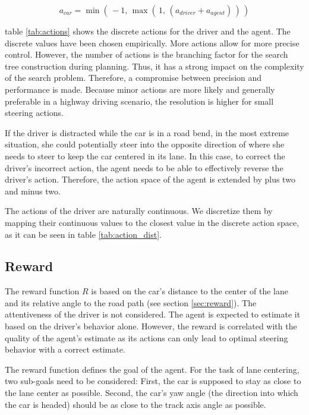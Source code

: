 \begin{equation}
    a_{car} = \min(\, -1, \, \max(\, 1, \, (a_{driver} + a_{agent})\,)\,)
    \label{eq:steering}
\end{equation}

\vspace{1em}
\noindent
table \ref{tab:actions} shows the discrete actions for the driver and the agent. The discrete values have been chosen empirically. More actions allow for more precise control. However, the number of actions is the branching factor for the search tree construction during planning. Thus, it has a strong impact on the complexity of the search problem. Therefore, a compromise between precision and performance is made. Because minor actions are more likely and generally preferable in a highway driving scenario, the resolution is higher for small steering actions.

If the driver is distracted while the car is in a road bend, in the most extreme situation, she could potentially steer into the opposite direction of where she needs to steer to keep the car centered in its lane. In this case, to correct the driver's incorrect action, the agent needs to be able to effectively reverse the driver's action. Therefore, the action space of the agent is extended by plus two and minus two.



\label{sec:driver_act_discr}
\noindent
The actions of the driver are naturally continuous. We discretize them by mapping their continuous values to the closest value in the discrete action space, as it can be seen in table \ref{tab:action_dist}.



\subsection{Reward}

The reward function $R$ is based on the car's distance to the center of the lane and its relative angle to the road path (see section \ref{sec:reward}). The attentiveness of the driver is not considered. The agent is expected to estimate it based on the driver's behavior alone. However, the reward is correlated with the quality of the agent's estimate as its actions can only lead to optimal steering behavior with a correct estimate.

\label{sec:reward}

The reward function defines the goal of the agent. For the task of lane centering, two sub-goals need to be considered: First, the car is supposed to stay as close to the lane center as possible. Second, the car's yaw angle (the direction into which the car is headed) should be as close to the track axis angle as possible. 

